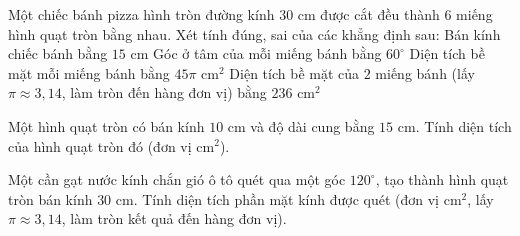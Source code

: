 \begin{ex}%
	Một chiếc bánh pizza hình tròn đường kính $30\text{ cm}$ được cắt đều thành $6$ miếng hình quạt tròn bằng nhau. Xét tính đúng, sai của các khẳng định sau:
	\choiceTF
	{\True Bán kính chiếc bánh bằng $15\text{ cm}$}
	{\True Góc ở tâm của mỗi miếng bánh bằng $60^\circ$}
	{Diện tích bề mặt mỗi miếng bánh bằng $45\pi\text{ cm}^2$}
	{\True Diện tích bề mặt của $2$ miếng bánh (lấy $\pi \approx 3{,}14$, làm tròn đến hàng đơn vị) bằng $236\text{ cm}^2$}
\end{ex}

\begin{bt}%
	Một hình quạt tròn có bán kính $10\text{ cm}$ và độ dài cung bằng $15\text{ cm}$. Tính diện tích của hình quạt tròn đó (đơn vị $\text{cm}^2$).
\end{bt}

\begin{bt}%
	Một cần gạt nước kính chắn gió ô tô quét qua một góc $120^\circ$, tạo thành hình quạt tròn bán kính $30\text{ cm}$. Tính diện tích phần mặt kính được quét (đơn vị $\text{cm}^2$, lấy $\pi \approx 3{,}14$, làm tròn kết quả đến hàng đơn vị).
\end{bt}


